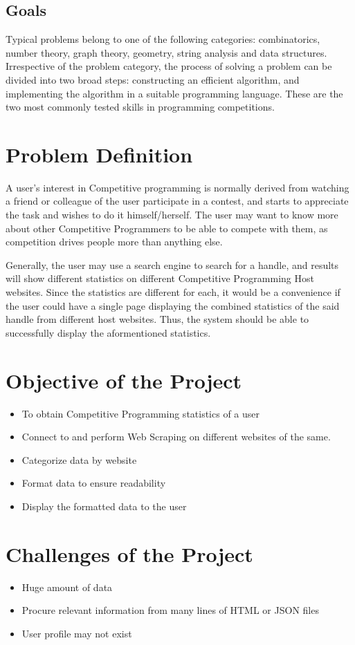 \documentclass[12pt,a4paper]{report}
\begin{document}
\subsection{Goals}
Typical problems belong to one of the following categories: combinatorics, number theory, graph theory, geometry, string analysis and data structures. Irrespective of the problem category, the process of solving a problem can be divided into two broad steps: constructing an efficient algorithm, and implementing the algorithm in a suitable programming language. These are the two most commonly tested skills in programming competitions.

\section{Problem Definition}
A user’s interest in Competitive programming is normally derived from watching a friend or colleague of the user participate in a contest, and starts to appreciate the task and wishes to do it himself/herself. The user may want to know more about other Competitive Programmers to be able to compete with them, as competition drives people more than anything else. 

Generally, the user may use a search engine to search for a handle, and results will show different statistics on different Competitive Programming Host websites. Since the statistics are different for each, it would be a convenience if the user could have a single page displaying the combined statistics of the said handle from different host websites. Thus, the system should be able to successfully display the aformentioned statistics.

\section{Objective of the Project}
\begin{itemize}[itemsep=0em]
	\item To obtain Competitive Programming statistics of a user
	\item Connect to and perform Web Scraping on different websites of the same.
	\item Categorize data by website
	\item Format data to ensure readability
	\item Display the formatted data to the user
\end{itemize}
\section{Challenges of the Project}
\begin{itemize}[itemsep=0em]
	\item Huge amount of data
	\item Procure relevant information from many lines of HTML or JSON files
	\item User profile may not exist
\end{itemize}
\end{document}
